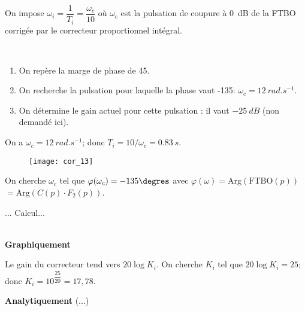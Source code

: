 On impose $\omega_i = \dfrac{1}{T_i}=\dfrac{\omega_c}{10}$ où $\omega_c$ est la pulsation de coupure à \SI{0}{dB} de la FTBO corrigée par le correcteur proportionnel intégral.

\ifprof
\begin{corrige}~\\
\begin{enumerate}
\item On repère la marge de phase de 45\degres.
\item On recherche la pulsation pour laquelle la phase vaut -135\degres : $\omega_c = \SI{12}{rad.s^{-1}}$.
\item On détermine le gain actuel pour cette pulsation : il vaut $-\SI{25}{dB}$ (non demandé ici). 
\end{enumerate}

On a  $\omega_c = \SI{12}{rad.s^{-1}}$; donc $T_i = 10/\omega_c = \SI{0,83}{s}$.

\begin{figure}[H]
\centering
\texttt{[image: cor\_13]}
\end{figure}



\end{corrige}
\else
\fi

\ifprof
\begin{corrige}
On cherche $\omega_c$ tel que $\varphi(\omega_c)=-135\degres$ avec $\varphi(\omega)=\text{Arg}\left(\text{FTBO}(p)\right)$ $ =\text{Arg}\left(C(p)\cdot {F_2}(p)\right)$. 

... Calcul...


\end{corrige}
\else
\fi

\ifprof
\begin{corrige} ~\\

\textbf{Graphiquement}

Le gain du correcteur tend vers $20 \log K_i $. On cherche $K_i$ tel que $20 \log K_i = 25$; donc $K_i = 10^{\dfrac{25}{20}}  = 17,78$.


\textbf{Analytiquement}
(...)
\end{corrige}
\else
\fi

